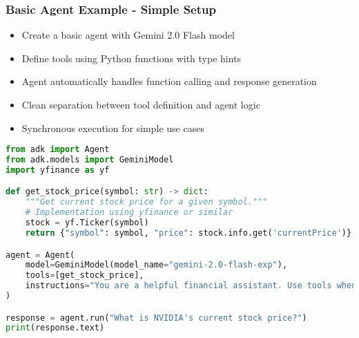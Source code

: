 \begin{frame}[fragile]\frametitle{Basic Agent Example - Simple Setup}
      \begin{itemize}
	\item Create a basic agent with Gemini 2.0 Flash model
	\item Define tools using Python functions with type hints
	\item Agent automatically handles function calling and response generation
	\item Clean separation between tool definition and agent logic
	\item Synchronous execution for simple use cases
	  \end{itemize}
      
      \begin{lstlisting}[language=python, basicstyle=\tiny]
from adk import Agent
from adk.models import GeminiModel
import yfinance as yf

def get_stock_price(symbol: str) -> dict:
    """Get current stock price for a given symbol."""
    # Implementation using yfinance or similar
    stock = yf.Ticker(symbol)
    return {"symbol": symbol, "price": stock.info.get('currentPrice')}

agent = Agent(
    model=GeminiModel(model_name="gemini-2.0-flash-exp"),
    tools=[get_stock_price],
    instructions="You are a helpful financial assistant. Use tools when needed."
)

response = agent.run("What is NVIDIA's current stock price?")
print(response.text)
      \end{lstlisting}
\end{frame}

